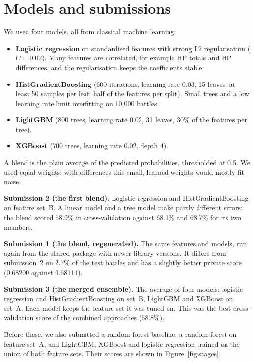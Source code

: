 \documentclass[11pt,a4paper]{article}
\begin{document}
\section{Models and submissions}

We used four models, all from classical machine learning:

\begin{itemize}
\item \textbf{Logistic regression} on standardised features with strong L2 regularisation
($C = 0.02$). Many features are correlated, for example HP totals and HP differences, and the
regularisation keeps the coefficients stable.
\item \textbf{HistGradientBoosting} (600 iterations, learning rate 0.03, 15 leaves, at least 50
samples per leaf, half of the features per split). Small trees and a low learning rate limit
overfitting on 10,000 battles.
\item \textbf{LightGBM} (800 trees, learning rate 0.02, 31 leaves, 30\% of the features per tree).
\item \textbf{XGBoost} (700 trees, learning rate 0.02, depth 4).
\end{itemize}

A blend is the plain average of the predicted probabilities, thresholded at 0.5. We used equal
weights: with differences this small, learned weights would mostly fit noise.

\textbf{Submission 2 (the first blend).} Logistic regression and HistGradientBoosting on feature
set~B. A linear model and a tree model make partly different errors: the blend scored 68.9\% in
cross-validation against 68.1\% and 68.7\% for its two members.

\textbf{Submission 1 (the blend, regenerated).} The same features and models, run again from the
shared package with newer library versions. It differs from submission~2 on 2.7\% of the test
battles and has a slightly better private score (0.68200 against 0.68114).

\textbf{Submission 3 (the merged ensemble).} The average of four models: logistic regression and
HistGradientBoosting on set~B, LightGBM and XGBoost on set~A. Each model keeps the feature set it
was tuned on. This was the best cross-validation score of the combined approaches (68.8\%).

Before these, we also submitted a random forest baseline, a random forest on feature set~A, and
LightGBM, XGBoost and logistic regression trained on the union of both feature sets. Their scores
are shown in Figure~\ref{fig:stages}.
\end{document}

